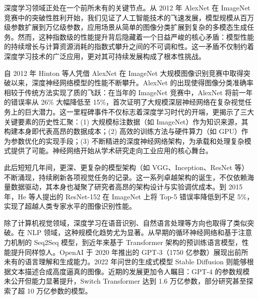 \documentclass[../main.tex]{subfiles}
\begin{document}
\label{ch:introduction}

\label{sec:intro-background}

深度学习领域正处在一个前所未有的关键节点。从 2012 年 AlexNet 在 ImageNet 竞赛中的突破性胜利开始\cite{imagenetclassificationdeep_krizhevsky_2012,imagenetlargescale_deng_2009}，我们见证了人工智能技术的飞速发展，模型规模从百万级参数扩展到万亿级参数\cite{switchtransformersscaling_fedus_2021,gpt4technical_openai_2023}，应用场景从简单的图像分类扩展到复杂的多模态生成任务\cite{highresolutionimage_rombach_2022}。然而，这种指数级的性能提升背后隐藏着一个日益严峻的核心矛盾：模型性能的持续增长与计算资源消耗的指数式攀升之间的不可调和性\cite{energypolicyconsiderations_strubell_2019,carbonfootprintmachine_patterson_2021}。这一矛盾不仅制约着深度学习技术的广泛应用，更对其可持续发展构成了根本性挑战。

\label{sec:ch1.1.1}

自 2012 年 Hinton 等人凭借 AlexNet 在 ImageNet 大规模图像识别竞赛中取得突破以来，深度神经网络模型的性能不断攀升\cite{imagenetclassificationdeep_krizhevsky_2012}。AlexNet 的出现使得图像分类准确率相较于传统方法实现了质的飞跃：在当年的 ImageNet 竞赛中，AlexNet 将前一年的错误率从 26\% 大幅降低至 15\%，首次证明了大规模深层神经网络在复杂视觉任务上的巨大潜力\cite{imagenetclassificationdeep_krizhevsky_2012}。这一里程碑事件不仅标志着深度学习时代的开端，更揭示了三大关键要素的历史性汇聚：(1) 大规模标注数据（如 ImageNet）作为知识来源，其构建本身即代表高昂的数据成本\cite{imagenetlargescale_deng_2009}；(2) 高效的训练方法与硬件算力（如 GPU）作为参数优化的实现手段\cite{imagenetclassificationdeep_krizhevsky_2012}；(3) 不断精进的深度神经网络架构，为承载和处理复杂模式提供了可能。神经网络开始从学术研究走向工业应用的核心舞台。

此后短短几年间，更深、更复杂的模型架构（如 VGG、Inception、ResNet 等）不断涌现，持续刷新各项视觉任务的记录\cite{verydeepconvolutional_simonyan_2015,goingdeeperconvolutions_szegedy_2015,deepresiduallearning_he_2016}。这一系列卓越架构的诞生，不仅依赖海量数据驱动，其本身也凝聚了研究者高昂的架构设计与实验调优成本。到 2015 年，He 等人提出的 ResNet-152 在 ImageNet 上将 Top-5 错误率降低到不足 5\%，实现了超越人类专家水平的图像识别性能\cite{deepresiduallearning_he_2016}。

除了计算机视觉领域，深度学习在语音识别、自然语言处理等方向也取得了类似突破。在 NLP 领域，这种规模化趋势尤为显著。从早期的循环神经网络和基于注意力机制的 Seq2Seq 模型，到近年来基于 Transformer 架构的预训练语言模型，性能提升同样惊人\cite{attentionisall_vaswani_2017,bertpretraining_devlin_2019}。OpenAI 于 2020 年推出的 GPT-3（1750 亿参数）展现出前所未有的语言理解和生成能力\cite{languagemodelsare_brown_2020}。2022 年问世的生成式模型 Stable Diffusion 则能够根据文本描述合成高度逼真的图像\cite{highresolutionimage_rombach_2022}。近期的发展更加令人瞩目：GPT-4 的参数规模未公开但能力显著提升\cite{gpt4technical_openai_2023}，Switch Transformer 达到 1.6 万亿参数\cite{switchtransformersscaling_fedus_2021}，部分研究甚至探索了超 10 万亿参数的模型\cite{glamefficientscaling_du_2022}。
\end{document}
